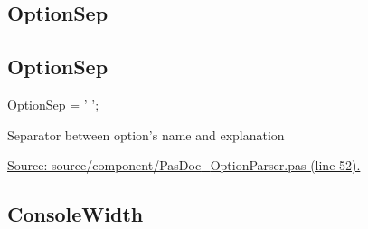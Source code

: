 \documentclass{report}
\newif\ifpdf
\begin{document}
\subsection*{\large{\textbf{OptionSep}}\normalsize\hspace{1ex}\hrulefill}
\else
\subsection*{OptionSep}
\fi
\label{PasDoc_OptionParser-OptionSep}
\begin{list}{}{
\setlength{\itemindent}{0cm}
\setlength{\listparindent}{0cm}
\setlength{\leftmargin}{\evensidemargin}
\addtolength{\leftmargin}{\tmplength}
\settowidth{\labelsep}{X}
\addtolength{\leftmargin}{\labelsep}
\setlength{\labelwidth}{\tmplength}
}
\item[\textbf{Declaration}\hfill]
\ifpdf
\begin{flushleft}
\fi
\begin{ttfamily}
OptionSep = '  ';\end{ttfamily}

\ifpdf
\end{flushleft}
\fi

\par
\item[\textbf{Description}]
Separator between option's name and explanation\par
\href{https://github.com/pasdoc/pasdoc/blob/master/source/component/PasDoc_OptionParser.pas#L52}{Source: source/component/PasDoc{\_}OptionParser.pas (line 52).}

\end{list}
\ifpdf
\subsection*{\large{\textbf{ConsoleWidth}}\normalsize\hspace{1ex}\hrulefill}
\else
\end{document}
